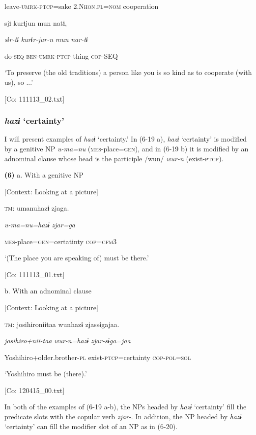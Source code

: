       leave-\textsc{umrk}-\textsc{ptcp}=sake  2.N\textsc{hon}.\textsc{pl}=\textsc{nom}  cooperation

      sjɨ  kurɨjun  mun  natɨ,

      \textit{sɨr-tɨ}  \textit{kurɨr-jur-n}  \textit{mun}  \textit{nar-tɨ}

      do-\textsc{seq}  \textsc{ben}-\textsc{umrk}-\textsc{ptcp}  thing  \textsc{cop}-SEQ

      ‘To preserve (the old traditions) a person like you is so kind as to cooperate (with us), so ...’

      [Co: 111113\_02.txt]

\subsubsection{\textit{hazɨ} ‘certainty’}

I will present examples of \textit{hazɨ} ‘certainty.’ In (6-19 a), \textit{hazɨ} ‘certainty’ is modified by a genitive NP \textit{u-ma=nu} (\textsc{mes}-place=\textsc{gen}), and in (6-19 b) it is modified by an adnominal clause whose head is the participle /wun/ \textit{wur-n} (exist-\textsc{ptcp}).

\textbf{(6)}  a.  With a genitive NP

    [Context: Looking at a picture]

    \textsc{tm}:  umanuhazɨ  zjaga.

      \textit{u-ma=nu=hazɨ}  \textit{zjar=ga}

      \textsc{mes}-place=\textsc{gen}=certatinty  \textsc{cop}=\textsc{cfm}3

      ‘(The place you are speaking of) must be there.’

      [Co: 111113\_01.txt]

  b.  With an adnominal clause

    [Context: Looking at a picture]

    \textsc{tm}:  josihironiitaa  wunhazɨ  zjassɨgajaa.

      \textit{josihiro+nii-taa}  \textit{wur-n=hazɨ}  \textit{zjar-sɨga=jaa}

      Yoshihiro+older.brother-\textsc{pl}  exist-\textsc{ptcp}=certainty  \textsc{cop}-\textsc{pol}=\textsc{sol}

      ‘Yoshihiro must be (there).’

      [Co: 120415\_00.txt]

In both of the examples of (6-19 a-b), the NPs headed by \textit{hazɨ} ‘certainty’ fill the predicate slots with the copular verb \textit{zjar-}. In addition, the NP headed by \textit{hazɨ} ‘certainty’ can fill the modifier slot of an NP as in (6-20).

